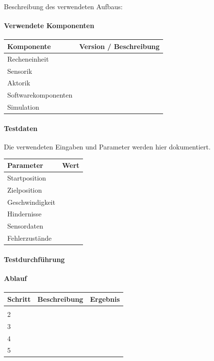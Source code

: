 \documentclass[
  a4paper,
  12pt,
  DIV=12,        %
  parskip=half,  %
  headings=small %
]{scrartcl}
\theoremstyle{definition}
\theoremstyle{definition}
\begin{document}
Beschreibung des verwendeten Aufbaus:

\paragraph{Verwendete Komponenten}\label{verwendete-komponenten}

\begin{longtable}[]{@{}ll@{}}
\toprule\noalign{}
Komponente & Version / Beschreibung \\
\midrule\noalign{}
\endhead
\bottomrule\noalign{}
\endlastfoot
Recheneinheit & \\
Sensorik & \\
Aktorik & \\
Softwarekomponenten & \\
Simulation & \\
\end{longtable}

\paragraph{Testdaten}\label{testdaten}

Die verwendeten Eingaben und Parameter werden hier dokumentiert.

\begin{longtable}[]{@{}ll@{}}
\toprule\noalign{}
Parameter & Wert \\
\midrule\noalign{}
\endhead
\bottomrule\noalign{}
\endlastfoot
Startposition & \\
Zielposition & \\
Geschwindigkeit & \\
Hindernisse & \\
Sensordaten & \\
Fehlerzustände & \\
\end{longtable}

\paragraph{Testdurchführung}\label{testdurchfuxfchrung}

\paragraph{Ablauf}\label{ablauf-34}

\begin{longtable}[]{@{}lll@{}}
\toprule\noalign{}
Schritt & Beschreibung & Ergebnis \\
\midrule\noalign{}
\endhead
\bottomrule\noalign{}
\endlastfoot
1 & & \\
2 & & \\
3 & & \\
4 & & \\
5 & & \\
\end{longtable}
\end{document}
